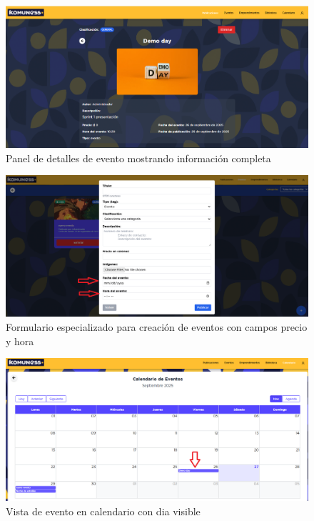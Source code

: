 \begin{figure}[H]
  \centering
  \includegraphics[width=\textwidth]{project/images/6.7.png}
  \caption{Panel de detalles de evento mostrando información completa}
  \label{fig:cal-detalles}
\end{figure}

\begin{figure}[H]
  \centering
  \includegraphics[width=\textwidth]{project/images/6.8.png}
  \caption{Formulario especializado para creación de eventos con campos precio y hora}
  \label{fig:cal-form}
\end{figure}

\begin{figure}[H]
  \centering
  \includegraphics[width=\textwidth]{project/images/6.6}
  \caption{Vista de evento en calendario con dia visible}
  \label{fig:cal-evento}
\end{figure}


